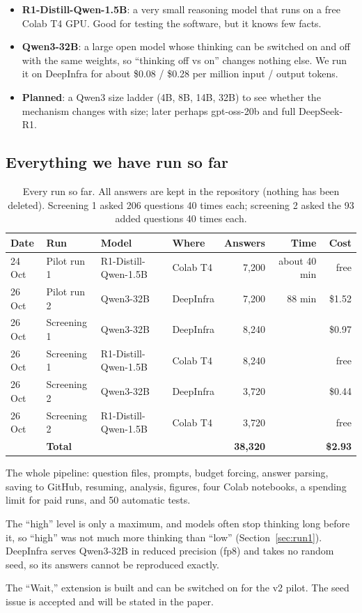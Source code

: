 \documentclass[11pt,a4paper]{article}
\newcommand{\dpn}[3]{%
\begin{tcolorbox}[breakable, colback=white, colframe=trline, boxrule=0.4pt, arc=0pt, left=6pt, right=6pt, top=4pt, bottom=4pt, before skip=10pt, after skip=10pt]
\small
\noindent{\color{donecol}\textsf{\textbf{DONE}}}\quad #1\par\medskip
\noindent{\color{probcol}\textsf{\textbf{PROBLEM}}}\quad #2\par\medskip
\noindent{\color{nextcol}\textsf{\textbf{WHAT WE DID / DO NEXT}}}\quad #3
\end{tcolorbox}}
\begin{document}
\begin{itemize}
  \item \textbf{R1-Distill-Qwen-1.5B}: a very small reasoning model that runs on a free Colab T4 GPU. Good for testing the software, but it knows few facts.
  \item \textbf{Qwen3-32B}: a large open model whose thinking can be switched on and off with the same weights, so ``thinking off vs on'' changes nothing else. We run it on DeepInfra for about \$0.08 / \$0.28 per million input / output tokens.
  \item \textbf{Planned}: a Qwen3 size ladder (4B, 8B, 14B, 32B) to see whether the mechanism changes with size; later perhaps gpt-oss-20b and full DeepSeek-R1.
\end{itemize}

\subsection{Everything we have run so far}

\begin{table}[ht]
\centering\small
\begin{tabular}{@{}llllrrr@{}}
\toprule
\textbf{Date} & \textbf{Run} & \textbf{Model} & \textbf{Where} & \textbf{Answers} & \textbf{Time} & \textbf{Cost} \\
\midrule
24 Oct & Pilot run 1 & R1-Distill-Qwen-1.5B & Colab T4 & 7,200 & about 40 min & free \\
26 Oct & Pilot run 2 & Qwen3-32B & DeepInfra & 7,200 & 88 min & \$1.52 \\
26 Oct & Screening 1 & Qwen3-32B & DeepInfra & 8,240 & & \$0.97 \\
26 Oct & Screening 1 & R1-Distill-Qwen-1.5B & Colab T4 & 8,240 & & free \\
26 Oct & Screening 2 & Qwen3-32B & DeepInfra & 3,720 & & \$0.44 \\
26 Oct & Screening 2 & R1-Distill-Qwen-1.5B & Colab T4 & 3,720 & & free \\
\midrule
 & \textbf{Total} & & & \textbf{38,320} & & \textbf{\$2.93} \\
\bottomrule
\end{tabular}
\caption{Every run so far. All answers are kept in the repository (nothing has been deleted). Screening 1 asked 206 questions 40 times each; screening 2 asked the 93 added questions 40 times each.}
\label{tab:runs}
\end{table}

\dpn{The whole pipeline: question files, prompts, budget forcing, answer parsing, saving to GitHub, resuming, analysis, figures, four Colab notebooks, a spending limit for paid runs, and 50 automatic tests.}
{The ``high'' level is only a maximum, and models often stop thinking long before it, so ``high'' was not much more thinking than ``low'' (Section~\ref{sec:run1}). DeepInfra serves Qwen3-32B in reduced precision (fp8) and takes no random seed, so its answers cannot be reproduced exactly.}
{The ``Wait,'' extension is built and can be switched on for the v2 pilot. The seed issue is accepted and will be stated in the paper.}
\end{document}
